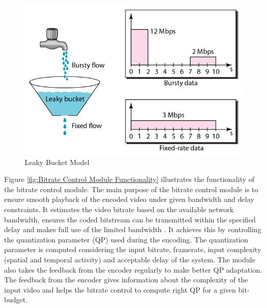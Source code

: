 \documentclass[11pt]{article} %
\begin{document}
\begin{figure}[h]
    \centering
    \includegraphics[scale=0.5]{general/Leaky_bucket}
    \caption{Leaky Bucket Model}
    \label{fig-Leaky-Bucket-Model}
\end{figure} 	
	Figure \ref{fig:Bitrate Control Module Functionality} illustrates the functionality of the bitrate control module. The main purpose of the bitrate control module is to ensure smooth playback of the encoded video under given bandwidth and delay constraints. It estimates the video bitrate based on the available network bandwidth, ensures the coded bitstream can be transmitted within the specified delay and makes full use of the limited bandwidth \cite{InTech-Rate-control-in-video-coding}. It achieves this by controlling the quantization parameter (QP) used during the encoding. The quantization parameter is computed considering the input bitrate, framerate, input complexity (spatial and temporal activity) and acceptable delay of the system. The module also takes the feedback from the encoder regularly to make better QP adaptation.  The feedback from the encoder gives information about the complexity of the input video and helps the bitrate control to compute right QP for a given bit-budget.
	
\end{document}
